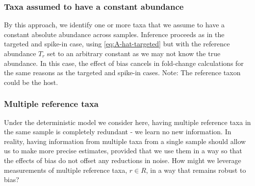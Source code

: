 \documentclass[
]{article}
\theoremstyle{definition}
\theoremstyle{definition}
\theoremstyle{definition}
\theoremstyle{definition}
\theoremstyle{remark}
\begin{document}
\hypertarget{taxa-assumed-to-have-a-constant-abundance}{%
\subsubsection{Taxa assumed to have a constant abundance}\label{taxa-assumed-to-have-a-constant-abundance}}

By this approach, we identify one or more taxa that we assume to have a constant absolute abundance across samples.
Inference proceeds as in the targeted and spike-in case, using \eqref{eq:A-hat-targeted} but with the reference abundance \(T_r\) set to an arbitrary constant as we may not know the true abundance.
In this case, the effect of bias cancels in fold-change calculations for the same reasons as the targeted and spike-in cases.
Note: The reference taxon could be the host.

\hypertarget{multiple-reference-taxa}{%
\subsubsection{Multiple reference taxa}\label{multiple-reference-taxa}}

Under the deterministic model we consider here, having multiple reference taxa in the same sample is completely redundant - we learn no new information.
In reality, having information from multiple taxa from a single sample should allow us to make more precise estimates, provided that we use them in a way so that the effects of bias do not offset any reductions in noise.
How might we leverage measurements of multiple reference taxa, \(r \in R\), in a way that remains robust to bias?
\end{document}
